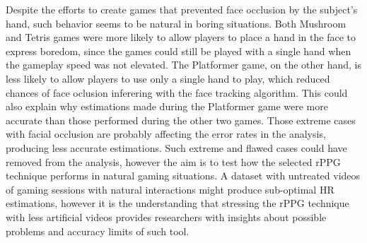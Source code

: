 Despite the efforts to create games that prevented face occlusion by the subject's hand, such behavior seems to be natural in boring situations. Both Mushroom and Tetris games were more likely to allow players to place a hand in the face to express boredom, since the games could still be played with a single hand when the gameplay speed was not elevated. The Platformer game, on the other hand, is less likely to allow players to use only a single hand to play, which reduced chances of face oclusion inferering with the face tracking algorithm. This could also explain why estimations made during the Platformer game were more accurate than those performed during the other two games. Those extreme cases with facial occlusion are probably affecting the error rates in the analysis, producing less accurate estimations. Such extreme and flawed cases could have removed from the analysis, however the aim is to test how the selected rPPG technique performs in natural gaming situations. A dataset with untreated videos of gaming sessions with natural interactions might produce sub-optimal HR estimations, however it is the understanding that stressing the rPPG technique with less artificial videos provides researchers with insights about possible problems and accuracy limits of such tool.

